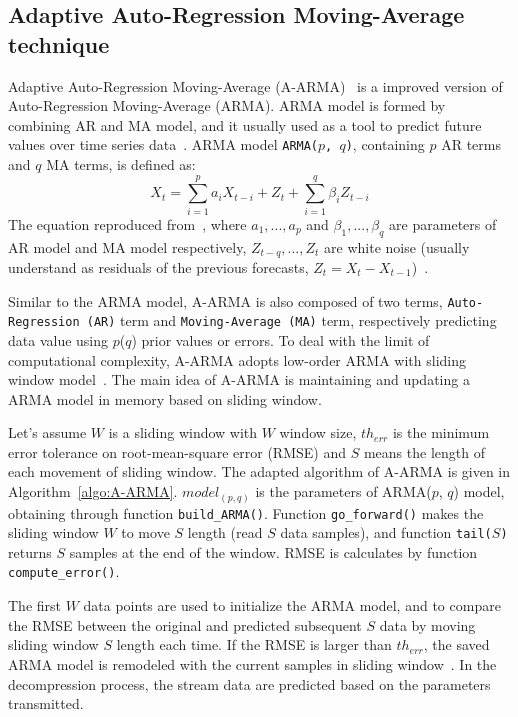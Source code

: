 \subsection{Adaptive Auto-Regression Moving-Average technique}


Adaptive Auto-Regression Moving-Average (A-ARMA)~\cite{lu2010optimized} is a
improved version of Auto-Regression Moving-Average (ARMA). ARMA model is formed
by combining AR and MA model, and it usually used as  a tool to predict future
values over time series data~\cite{chatfield2016analysis}. ARMA model
\texttt{ARMA($p$, $q$)}, containing $p$ AR terms and $q$ MA terms, is defined
as:
\begin{equation}
X_t = \sum_{i=1}^{p}a_{i}X_{t-i} + Z_t + \sum_{i=1}^{q}\beta_{i}Z_{t-i}
\end{equation}
\noindent The equation reproduced from~\cite{chatfield2016analysis}, where 
$a_1, ..., a_p$ and $\beta_1, ..., \beta_q$ are parameters of AR model and MA
model respectively, $Z_{t-q}, ...,Z_{t}$ are white noise (usually understand as
residuals of the previous forecasts, $Z_t = X_t -
X_{t-1}$)~\cite{chatfield2016analysis}.

Similar to the ARMA model, A-ARMA is also composed of
two terms, \texttt{Auto-Regression (AR)} term and \texttt{Moving-Average (MA)}
term, respectively predicting data value using $p$($q$) prior values or errors. 
To deal with the limit of computational complexity, A-ARMA adopts low-order ARMA
with sliding window model~\cite{lu2010optimized}. The main idea of A-ARMA is
maintaining and updating a ARMA model in memory based on sliding window. 

Let's assume $W$ is a sliding window with $W$ window size, $th_{err}$ is the
minimum error tolerance on root-mean-square error (RMSE) and $S$ means the
length of each movement of sliding window. The adapted algorithm of A-ARMA is
given in Algorithm~\ref{algo:A-ARMA}. $model_{(p, q)}$ is the parameters of
ARMA($p$, $q$) model, obtaining through function \texttt{build\_ARMA()}.
Function \texttt{go\_forward()} makes the sliding window $W$ to move $S$ length
(read $S$ data samples), and function \texttt{tail($S$)} returns $S$ samples at
the end of the window. RMSE is calculates by function \texttt{compute\_error()}.

The first $W$ data points are used to initialize the ARMA model, and to compare
the RMSE between the original and predicted subsequent $S$ data by moving
sliding window $S$ length each time. If the RMSE is larger than $th_{err}$, the
saved ARMA model is remodeled with the current samples in sliding
window~\cite{lu2010optimized}.
In the decompression process, the stream data are predicted based on the
parameters transmitted.


